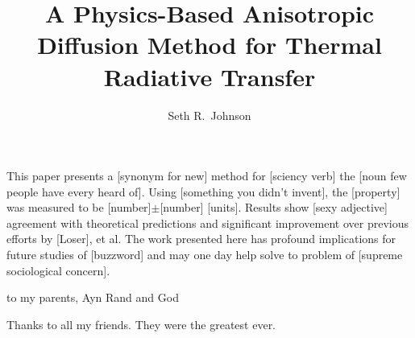 \documentclass[12pt, letterpaper]{umthesis}
\author{Seth R.~Johnson}
\title{A Physics-Based Anisotropic Diffusion Method for Thermal Radiative
Transfer}
\begin{document}
\frontmatter

\maketitle

\begin{finalabstract}
  This paper presents a [synonym for new] method for [sciency verb] the [noun
  few people have every heard of]. Using [something you didn't invent],
  the [property] was measured to be [number]$\pm$[number] [units].
  Results show [sexy adjective] agreement with theoretical predictions and
  significant improvement over previous efforts by [Loser], et al. The work
  presented here has profound implications for future studies of [buzzword] and
  may one day help solve to problem of [supreme sociological concern].
\end{finalabstract}
\makecopyright


\begin{dedication}
  to my parents, Ayn Rand and God
\end{dedication}

\begin{acknowledgments}
  Thanks to all my friends. They were the greatest ever.
\end{acknowledgments}


\tableofcontents
\listoftables
\listoffigures


\mainmatter


%
%
%
%

%


%

\backmatter


\end{document}
